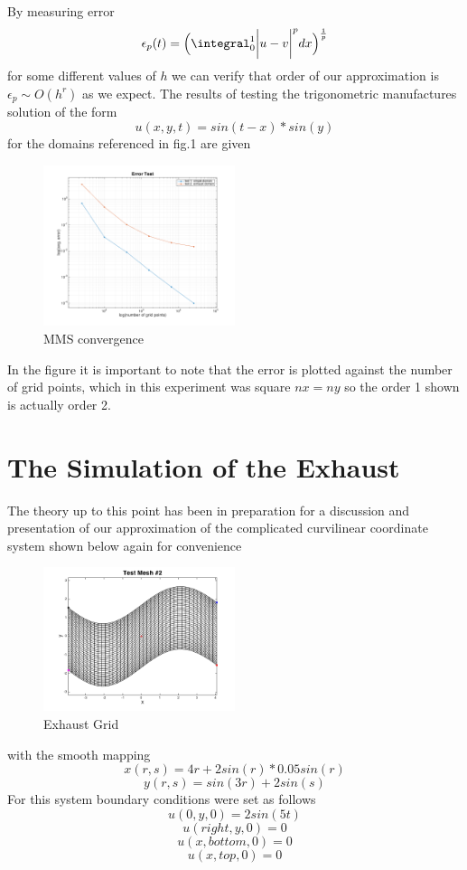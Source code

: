 \documentclass{article}
\begin{document}
By measuring error
\[
\epsilon_{p}(t)=\Big(\integral_{0}^{1}\bigg|u-v\bigg|^{p}dx\Big)^{\frac{1}{p}}
\]
for some different values of \(h\) we can verify that order of our approximation is \(\epsilon_{p}\sim O(h^{r})\) as we expect. The results of testing the trigonometric manufactures solution of the form
\[
u(x,y,t)=sin(t-x)*sin(y)
\]
for the domains referenced in fig.1 are given
\begin{figure}[h]
\caption{MMS convergence}
\centering
\includegraphics[width=0.5\textwidth]{ErrorTest_TrigMMS}
\end{figure}
In the figure it is important to note that the error is plotted against the number of grid points, which in this experiment was square \(nx=ny\) so the order 1 shown is actually order 2.

\section{The Simulation of the Exhaust}

The theory up to this point has been in preparation for a discussion and presentation of our approximation of the complicated curvilinear coordinate system shown below again for convenience
\begin{figure}[h]
\caption{Exhaust Grid}
\centering
\includegraphics[width=0.5\textwidth]{exhaustmesh}
\end{figure}
with the smooth mapping
\[
x(r,s) = 4r+2sin(r)*0.05sin(r)
\]
\[
y(r,s) = sin(3r)+2sin(s)
\]
For this system boundary conditions were set as follows
\[
u(0,y,0) = 2sin(5t)
\]
\[
u(right,y,0) = 0
\]
\[
u(x,bottom,0) = 0
\]
\[
u(x,top,0) = 0
 \]
 
\end{document}

